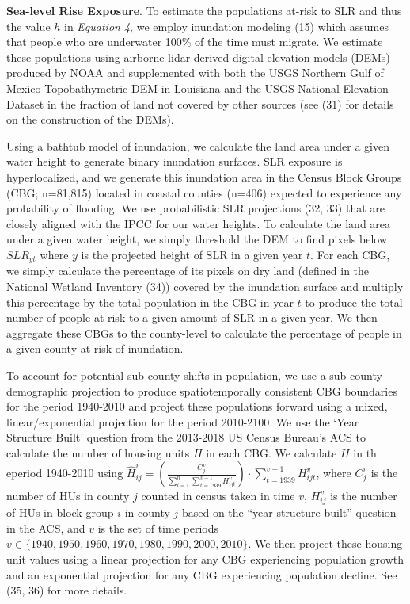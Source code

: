 \documentclass[9pt,twocolumn,twoside,]{pnas-new}
\begin{document}
\textbf{Sea-level Rise Exposure}. To estimate the populations at-risk to
SLR and thus the value \(h\) in \emph{Equation 4}, we employ inundation
modeling (15) which assumes that people who are underwater 100\% of the
time must migrate. We estimate these populations using airborne
lidar-derived digital elevation models (DEMs) produced by NOAA and
supplemented with both the USGS Northern Gulf of Mexico Topobathymetric
DEM in Louisiana and the USGS National Elevation Dataset in the fraction
of land not covered by other sources (see (31) for details on the
construction of the DEMs).

Using a bathtub model of inundation, we calculate the land area under a
given water height to generate binary inundation surfaces. SLR exposure
is hyperlocalized, and we generate this inundation area in the Census
Block Groups (CBG; n=81,815) located in coastal counties (n=406)
expected to experience any probability of flooding. We use probabilistic
SLR projections (32, 33) that are closely aligned with the IPCC for our
water heights. To calculate the land area under a given water height, we
simply threshold the DEM to find pixels below \(SLR_{yt}\) where \(y\)
is the projected height of SLR in a given year \(t\). For each CBG, we
simply calculate the percentage of its pixels on dry land (defined in
the National Wetland Inventory (34)) covered by the inundation surface
and multiply this percentage by the total population in the CBG in year
\(t\) to produce the total number of people at-risk to a given amount of
SLR in a given year. We then aggregate these CBGs to the county-level to
calculate the percentage of people in a given county at-risk of
inundation.

To account for potential sub-county shifts in population, we use a
sub-county demographic projection to produce spatiotemporally consistent
CBG boundaries for the period 1940-2010 and project these populations
forward using a mixed, linear/exponential projection for the period
2010-2100. We use the `Year Structure Built' question from the 2013-2018
US Census Bureau's ACS to calculate the number of housing units \(H\) in
each CBG. We calculate \(H\) in th eperiod 1940-2010 using
\(\hat{H}^v_{ij} = \left( \frac{C^v_j}{\sum_{i=1}^{n}\sum_{t=1939}^{v-1} H^v_{ijt}} \right) \cdot \displaystyle\sum_{t=1939}^{v-1} H_{ijt}^{v}\),
where \(C_j^v\) is the number of HUs in county \(j\) counted in census
taken in time \(v\), \(H^v_{ij}\) is the number of HUs in block group
\(i\) in county \(j\) based on the ``year structure built'' question in
the ACS, and \(v\) is the set of time periods
\(v\in\{1940,1950,1960,1970,1980,1990,2000,2010\}\). We then project
these housing unit values using a linear projection for any CBG
experiencing population growth and an exponential projection for any CBG
experiencing population decline. See (35, 36) for more details.
\end{document}
